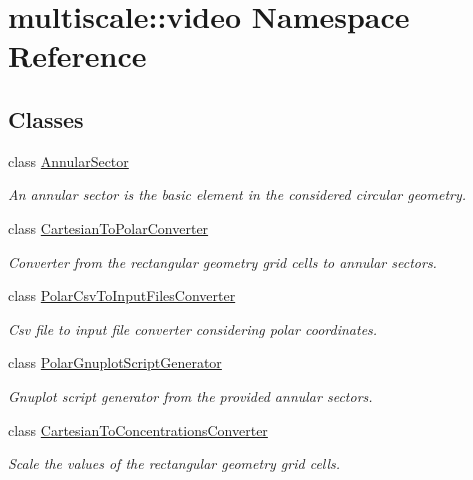 \hypertarget{namespacemultiscale_1_1video}{\section{multiscale\-:\-:video Namespace Reference}
\label{namespacemultiscale_1_1video}
}
\subsection*{Classes}
\begin{DoxyCompactItemize}
\item 
class \hyperlink{classmultiscale_1_1video_1_1AnnularSector}{Annular\-Sector}
\begin{DoxyCompactList}\small\item\em An annular sector is the basic element in the considered circular geometry. \end{DoxyCompactList}\item 
class \hyperlink{classmultiscale_1_1video_1_1CartesianToPolarConverter}{Cartesian\-To\-Polar\-Converter}
\begin{DoxyCompactList}\small\item\em Converter from the rectangular geometry grid cells to annular sectors. \end{DoxyCompactList}\item 
class \hyperlink{classmultiscale_1_1video_1_1PolarCsvToInputFilesConverter}{Polar\-Csv\-To\-Input\-Files\-Converter}
\begin{DoxyCompactList}\small\item\em Csv file to input file converter considering polar coordinates. \end{DoxyCompactList}\item 
class \hyperlink{classmultiscale_1_1video_1_1PolarGnuplotScriptGenerator}{Polar\-Gnuplot\-Script\-Generator}
\begin{DoxyCompactList}\small\item\em Gnuplot script generator from the provided annular sectors. \end{DoxyCompactList}\item 
class \hyperlink{classmultiscale_1_1video_1_1CartesianToConcentrationsConverter}{Cartesian\-To\-Concentrations\-Converter}
\begin{DoxyCompactList}\small\item\em Scale the values of the rectangular geometry grid cells. \end{DoxyCompactList}\item 

\end{DoxyCompactItemize}
